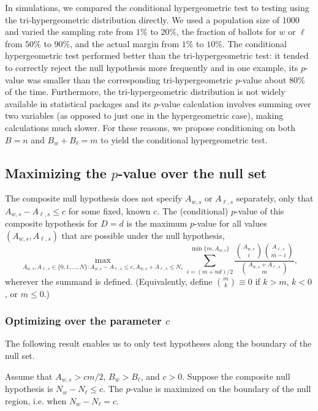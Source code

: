 In simulations, we compared the conditional hypergeometric test to testing using the tri-hypergeometric distribution directly.
We used a population size of 1000 and varied the sampling rate from $1\%$ to $20\%$,
 the fraction of ballots for $w$ or $\ell$ from $50\%$ to $90\%$,
and  the actual margin from $1\%$ to $10\%$.
The conditional hypergeometric test performed better than the tri-hypergeometric test:
it tended to correctly reject the null hypothesis more frequently and in one example, its $p$-value was
smaller than the corresponding tri-hypergeometric $p$-value about 80\% of the time.
Furthermore, the tri-hypergeometric distribution is not widely available in statistical packages and its $p$-value calculation involves 
summing over two variables (as opposed to just one in the hypergeometric case), making calculations much slower.
For these reasons, we propose conditioning on both $B=n$ and $B_w+B_\ell=m$ to yield the conditional hypergeometric test.

\subsection{Maximizing the $p$-value over the null set}

The composite null hypothesis does not specify $A_{w,s}$ or $A_{\ell,s}$ separately, only 
that $A_{w,s} - A_{\ell,s} \le c$ for
some fixed, known $c$.
The (conditional) $p$-value of this composite hypothesis for $D=d$ is the maximum $p$-value for all
values $(A_{w,s}, A_{\ell,s})$ that are possible under the null hypothesis,
\begin{equation}
  \max_{A_{w,s}, A_{\ell,s} \in \{0, 1, \ldots, N \}: A_{w,s} - A_{\ell,s} \le c, A_{w,s} + A_{\ell,s} \le N_s}
   \sum_{i = (m+nd)/2}^{\min\{m, A_{w,s}\}} \frac{ {A_{w,s} \choose i}{A_{\ell,s} \choose m-i} }{{A_{w,s} + A_{\ell, s} \choose m}},
\end{equation}
wherever the summand is defined. 
(Equivalently, define ${m \choose k} \equiv 0$ if $k > m$, $k < 0$, or $m \le 0$.)

\subsubsection{Optimizing over the parameter $c$}
The following result enables us to only test hypotheses along the boundary of the null set.

\begin{thm}
Assume that $A_{w,s} > cm/2$, $B_w > B_\ell$, and $c>0$.
Suppose the composite null hypothesis is $N_w - N_\ell \leq c$.
The $p$-value is maximized on the boundary of the null region, i.e. when $N_w - N_\ell = c$.
\end{thm}

